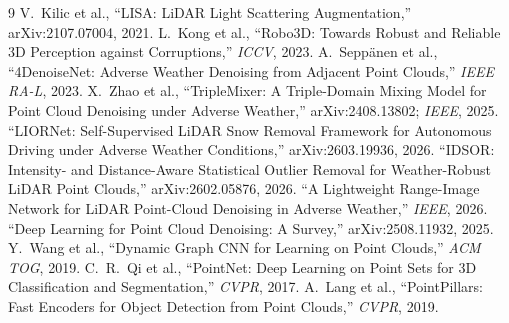 \documentclass[11pt,a4paper]{article}
\begin{document}
\begin{thebibliography}{9}
\small
{} V.~Kilic et al., ``LISA: LiDAR Light Scattering Augmentation,''
arXiv:2107.07004, 2021.
 L.~Kong et al., ``Robo3D: Towards Robust and Reliable 3D
Perception against Corruptions,'' \emph{ICCV}, 2023.
 A.~Seppänen et al., ``4DenoiseNet: Adverse Weather
Denoising from Adjacent Point Clouds,'' \emph{IEEE RA-L}, 2023.
 X.~Zhao et al., ``TripleMixer: A Triple-Domain Mixing
Model for Point Cloud Denoising under Adverse Weather,'' arXiv:2408.13802;
\emph{IEEE}, 2025.
 ``LIORNet: Self-Supervised LiDAR Snow Removal Framework for
Autonomous Driving under Adverse Weather Conditions,'' arXiv:2603.19936, 2026.
 ``IDSOR: Intensity- and Distance-Aware Statistical Outlier
Removal for Weather-Robust LiDAR Point Clouds,'' arXiv:2602.05876, 2026.
 ``A Lightweight Range-Image Network for LiDAR Point-Cloud
Denoising in Adverse Weather,'' \emph{IEEE}, 2026.
 ``Deep Learning for Point Cloud Denoising: A Survey,''
arXiv:2508.11932, 2025.
 Y.~Wang et al., ``Dynamic Graph CNN for Learning on Point
Clouds,'' \emph{ACM TOG}, 2019.
 C.~R.~Qi et al., ``PointNet: Deep Learning on Point Sets
for 3D Classification and Segmentation,'' \emph{CVPR}, 2017.
 A.~Lang et al., ``PointPillars: Fast Encoders for
Object Detection from Point Clouds,'' \emph{CVPR}, 2019.
\end{thebibliography}
\end{document}
